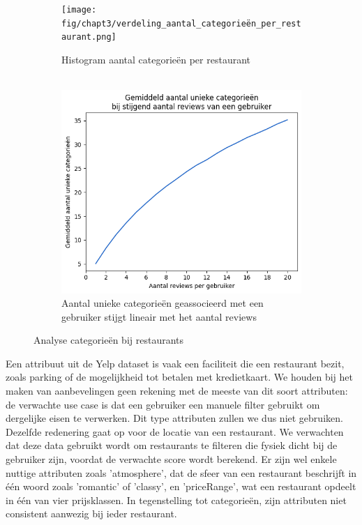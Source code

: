 \begin{figure}[H]
    \begin{subfigure}{.5\textwidth}
        \centering
        \texttt{[image: fig/chapt3/verdeling\_aantal\_categorieën\_per\_restaurant.png]}
        \caption{Histogram aantal categorieën per restaurant \\ \\}
        \label{fig:chapt3_verdeling_aantal_categorieën_per_restaurant}
    \end{subfigure}
    \begin{subfigure}{.5\textwidth}
        \centering
        \includegraphics[width=1\linewidth]{fig/chapt3/stijging_categorieen_per_gebruiker.png}
        \caption{Aantal unieke categorieën geassocieerd met een gebruiker stijgt lineair met het aantal reviews}
        \label{fig:chapt3_stijging_categorieen_per_gebruiker}
    \end{subfigure}
    \caption{Analyse categorieën bij restaurants}
    \label{fig:chapt3_categorieen_combined}
\end{figure}

Een attribuut uit de Yelp dataset is vaak een faciliteit die een restaurant bezit, zoals parking of de mogelijkheid tot betalen met kredietkaart. We houden bij het maken van aanbevelingen geen rekening met de meeste van dit soort attributen: de verwachte use case is dat een gebruiker een manuele filter gebruikt om dergelijke eisen te verwerken. Dit type attributen zullen we dus niet gebruiken. Dezelfde redenering gaat op voor de locatie van een restaurant. We verwachten dat deze data gebruikt wordt om restaurants te filteren die fysiek dicht bij de gebruiker zijn, voordat de verwachte score wordt berekend.\newline
Er zijn wel enkele nuttige attributen zoals 'atmosphere', dat de sfeer van een restaurant beschrijft in één woord zoals 'romantic' of 'classy', en 'priceRange', wat een restaurant opdeelt in één van vier prijsklassen. In tegenstelling tot categorieën, zijn attributen niet consistent aanwezig bij ieder restaurant. 
